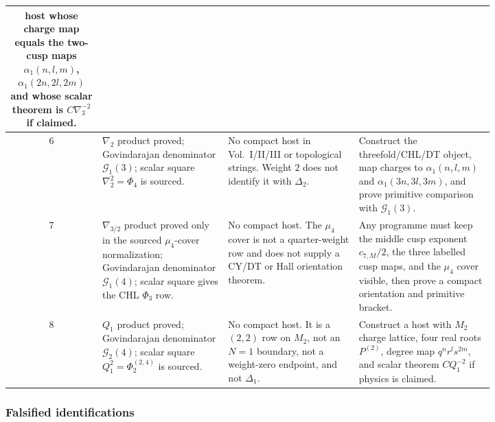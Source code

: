 \begin{center}
\begin{tabular}{c|p{0.26\linewidth}|p{0.27\linewidth}|p{0.29\linewidth}}
host whose charge map equals the two-cusp maps
\(\alpha_1(n,l,m)\), \(\alpha_1(2n,2l,2m)\) and whose scalar theorem is
\(C\nabla_3^{-2}\) if claimed.\\ \hline
6&
\(\nabla_2\) product proved; Govindarajan denominator
\(\mathcal G_1(3)\); scalar square \(\nabla_2^2=\Phi_4\) is sourced.&
No compact host in Vol.~I/II/III or topological strings.  Weight \(2\)
does not identify it with \(\Delta_2\).&
Construct the threefold/CHL/DT object, map charges to
\(\alpha_1(n,l,m)\) and \(\alpha_1(3n,3l,3m)\), and prove primitive
comparison with \(\mathcal G_1(3)\).\\ \hline
7&
\(\nabla_{3/2}\) product proved only in the sourced
\(\mu_4\)-cover normalization; Govindarajan denominator
\(\mathcal G_1(4)\); scalar square gives the CHL \(\Phi_3\) row.&
No compact host.  The \(\mu_4\) cover is not a quarter-weight row and
does not supply a CY/DT or Hall orientation theorem.&
Any programme must keep the middle cusp exponent
\(c_{7,M}/2\), the three labelled cusp maps, and the \(\mu_4\) cover
visible, then prove a compact orientation and primitive bracket.\\
\hline
8&
\(Q_1\) product proved; Govindarajan denominator
\(\mathcal G_2(4)\); scalar square \(Q_1^2=\Phi_2^{(2,4)}\) is
sourced.&
No compact host.  It is a \((2,2)\) row on \(M_2\), not an \(N=1\)
boundary, not a weight-zero endpoint, and not \(\Delta_1\).&
Construct a host with \(M_2\) charge lattice, four real roots
\(P^{(2)}\), degree map \(q^nr^ls^{2m}\), and scalar theorem
\(CQ_1^{-2}\) if physics is claimed.
\end{tabular}
\end{center}

\subsubsection*{Falsified identifications}

